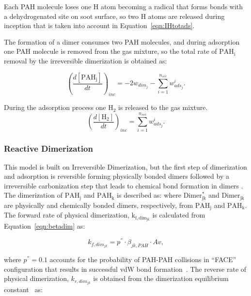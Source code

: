 Each PAH molecule loses one H atom becoming a radical that forms bonds with a dehydrogenated site on soot surface, so two H atoms are released during inception that is taken into account in Equation~\eqref{eqn:IHtotads}.

The formation of a dimer consumes two PAH molecules, and during adsorption one PAH molecule is removed from the gas mixture, so the total rate of $\mathrm{PAH_i}$ removal by the irreversible dimerization is obtained as:

\begin{equation}
	\left(
	\frac{d\left[{\mathrm{PAH_j}}\right]}{dt}
	\right)_{inc}
	= 
	-2w_{dim_j}-\sum_{i=1}^{n_{sec}}w^i_{ads_j}
	\label{eqn:PAHscrub_irrevdim}.
\end{equation}

During the adsorption process one $\mathrm{H_2}$ is released to the gas mixture.
\begin{equation}
	\left(
	\frac{d\left[{\mathrm{H_2}}\right]}{dt}
	\right)_{inc}
	= 
	\sum_{i=1}^{n_{sec}}w^i_{ads_j}
	\label{eqn:H2scrub_irrevdim}.
\end{equation}


\subsubsection{Reactive Dimerization}
This model is built on Irreversible Dimerization, but the first step of dimerization and adsorption is reversible forming physically bonded dimers followed by a irreversible carbonization step that leads to chemical bond formation in dimers \citep{kholghy2018reactive}. The dimerization of $\mathrm{PAH_j}$ and $\mathrm{PAH_k}$ is described as:
  \noindent  where $\mathrm{Dimer^*_{jk}}$ and $\mathrm{Dimer_{jk}}$ are physically and chemically bonded dimers, respectively, from $\mathrm{PAH_j}$ and $\mathrm{PAH_k}$. The forward rate of physical dimerization, $\mathrm{k_{f,dim_{jk}}}$ is calculated from Equation~\eqref{eqn:betadim} as:

\begin{equation}
	k_{f,dim_{jk}}=
	p^{''}\cdot\beta_{jk,PAH}\cdot Av
	\label{eqn:kfphydim_reacdim},
\end{equation}

  \noindent where ${p^{''}}=0.1$ accounts for the probability of PAH-PAH collisions in “FACE” configuration that results in successful vdW bond formation~\citep{miller1984intermolecular}. The reverse rate of physical dimerization, ${k_{r,dim_{jk}}}$ is obtained from the dimerization equilibrium constant~\citep{miller1991kinetics} as:

